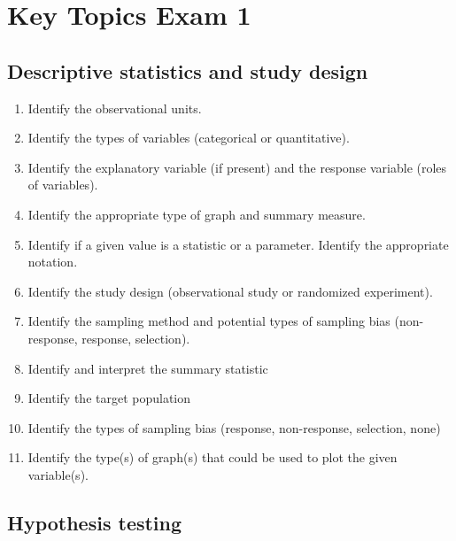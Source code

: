 \documentclass[
]{report}
\begin{document}
\vspace{0.6in}

\newpage

\section{Key Topics Exam 1}\label{key-topics-exam-1}

\subsection*{Descriptive statistics and study design}\label{descriptive-statistics-and-study-design}

\begin{enumerate}
\def\labelenumi{\arabic{enumi}.}
\item
  Identify the observational units.
\item
  Identify the types of variables (categorical or quantitative).
\item
  Identify the explanatory variable (if present) and the response variable (roles of variables).
\item
  Identify the appropriate type of graph and summary measure.
\item
  Identify if a given value is a statistic or a parameter. Identify the appropriate notation.
\item
  Identify the study design (observational study or randomized experiment).
\item
  Identify the sampling method and potential types of sampling bias (non-response, response, selection).
\item
  Identify and interpret the summary statistic
\item
  Identify the target population
\item
  Identify the types of sampling bias (response, non-response, selection, none)
\item
  Identify the type(s) of graph(s) that could be used to plot the given variable(s).
\end{enumerate}

\subsection*{Hypothesis testing}\label{hypothesis-testing-1}
\end{document}
